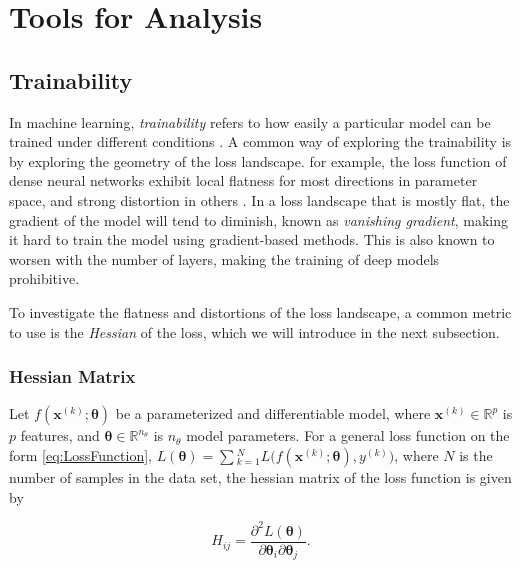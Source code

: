\chapter{Tools for Analysis}\label{chap:TfA}



\section{Trainability}\label{sec:Trainability}
In machine learning, \emph{trainability} refers to how easily a particular model can be trained under different conditions \cite{abbas2020power}. A common way of exploring the trainability is by exploring the geometry of the loss landscape. for example, the loss function of dense neural networks exhibit local flatness for most directions in parameter space, and strong distortion in others \cite{karakida2019universal}. In a loss landscape that is mostly flat, the gradient of the model will tend to diminish, known as \emph{vanishing gradient}, making it hard to train the model using gradient-based methods. This is also known to worsen with the number of layers, making the training of deep models prohibitive.

To investigate the flatness and distortions of the loss landscape, a common metric to use is the \emph{Hessian} of the loss, which we will introduce in the next subsection. 
\subsection{Hessian Matrix}\label{sec:HessianMatrix}
Let $f(\boldsymbol{x}^{(k)}; \boldsymbol{\theta})$ be a parameterized and differentiable model, where $\boldsymbol{x}^{(k)} \in \mathbb{R}^p$ is $p$ features, and $\boldsymbol{\theta} \in \mathbb{R}^{n_\theta}$ is $n_{\theta}$ model parameters. For a general loss function on the form \autoref{eq:LossFunction}, $L(\boldsymbol{\theta}) = \sum{_{k=1}^{N}L(f(\boldsymbol{x}^{(k)};\boldsymbol{\theta}), y^{(k)}})$, where $N$ is the number of samples in the data set, the hessian matrix of the loss function is given by

\begin{equation}
\label{eq:Hessian}
    H_{ij} = \frac{\partial^2 L(\boldsymbol{\theta})}{\partial \boldsymbol{\theta}_i\partial \boldsymbol{\theta}_j}.
\end{equation}

